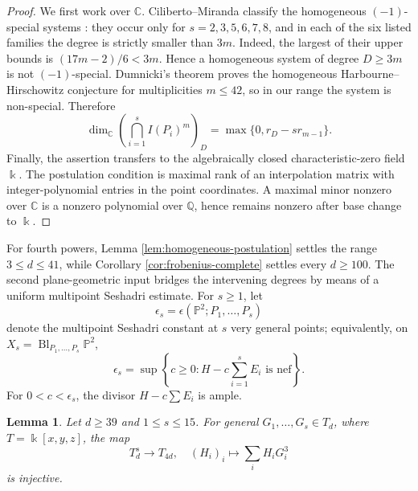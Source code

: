 \documentclass[11pt]{amsart}
\newtheorem{lemma}[theorem]{Lemma}
\theoremstyle{remark}
\newcommand{\PP}{\mathbb P}
\newcommand{\kk}{\Bbbk}
\begin{document}
\begin{proof}
We first work over $\mathbb C$. Ciliberto--Miranda classify the homogeneous $(-1)$-special systems \cite[Theorem~2.4]{CilibertoMiranda}: they occur only for $s=2,3,5,6,7,8$, and in each of the six listed families the degree is strictly smaller than $3m$. Indeed, the largest of their upper bounds is $(17m-2)/6<3m$. Hence a homogeneous system of degree $D\ge3m$ is not $(-1)$-special. Dumnicki's theorem \cite[Theorem~32]{Dumnicki} proves the homogeneous Harbourne--Hirschowitz conjecture for multiplicities $m\le42$, so in our range the system is non-special. Therefore
$$
\dim_{\mathbb C}\left(\bigcap_{i=1}^s I(P_i)^m\right)_D
=
\max\{0,r_D-sr_{m-1}\}.
$$
Finally, the assertion transfers to the algebraically closed characteristic-zero field $\kk$. The postulation condition is maximal rank of an interpolation matrix with integer-polynomial entries in the point coordinates. A maximal minor nonzero over $\mathbb C$ is a nonzero polynomial over $\mathbb Q$, hence remains nonzero after base change to $\kk$.
\end{proof}

For fourth powers, Lemma \ref{lem:homogeneous-postulation} settles the range $3\le d\le41$, while Corollary \ref{cor:frobenius-complete} settles every $d\ge100$. The second plane-geometric input bridges the intervening degrees by means of a uniform multipoint Seshadri estimate. For $s\ge1$, let
$$
\epsilon_s
=
\epsilon(\PP^2;P_1,\ldots,P_s)
$$
denote the multipoint Seshadri constant at $s$ very general points; equivalently, on $X_s=\operatorname{Bl}_{P_1,\ldots,P_s}\PP^2$,
$$
\epsilon_s
=
\sup\left\{c\ge0:H-c\sum_{i=1}^sE_i\text{ is nef}\right\}.
$$
For $0 < c < \epsilon_s$, the divisor $H-c\sum E_i$ is ample.

\begin{lemma}\label{lem:fourth-seshadri}
Let $d\ge39$ and $1\le s\le15$. For general $G_1,\ldots,G_s\in T_d$, where $T=\kk[x,y,z]$, the map
$$
T_d^s\longrightarrow T_{4d},
\quad
(H_i)_i\longmapsto\sum_iH_iG_i^3
$$
is injective.
\end{lemma}
\end{document}
